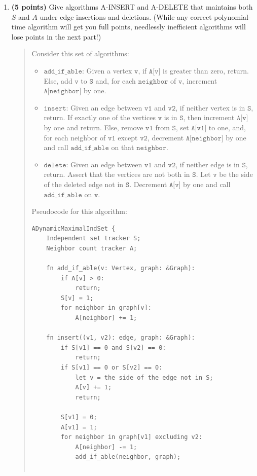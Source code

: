 \documentclass[11pt]{article}
\newcommand{\code}[1]{$\texttt{#1}$}
\begin{document}
\begin{enumerate}
\begin{enumerate}[resume]
    \item {\bf (5 points)} Give algorithms A-INSERT and A-DELETE that maintains both $S$ and $A$ under edge insertions and deletions. (While any correct polynomial-time algorithm will get you full points, needlessly inefficient algorithms will lose points in the next part!)
    \begin{quote}
      \color{purple}
      Consider this set of algorithms: 
      \begin{itemize}
        \item \code{add\_if\_able}: Given a vertex \code{v}, if \code{A[v]} is greater than zero, return. Else, add \code{v} to \code{S} and, for each \code{neighbor} of \code{v}, increment \code{A[neighbor]} by one.
        \item \code{insert}: Given an edge between \code{v1} and \code{v2}, if neither vertex is in \code{S}, return. If exactly one of the vertices \code{v} is in \code{S}, then increment \code{A[v]} by one and return. Else, remove \code{v1} from \code{S}, set \code{A[v1]} to one, and, for each neighbor of \code{v1} except \code{v2}, decrement \code{A[neighbor]} by one and call \code{add\_if\_able} on that \code{neighbor}.
        \item \code{delete}: Given an edge between \code{v1} and \code{v2}, if neither edge is in \code{S}, return. Assert that the vertices are not both in \code{S}. Let \code{v} be the side of the deleted edge not in \code{S}. Decrement \code{A[v]} by one and call \code{add\_if\_able} on \code{v}.
      \end{itemize}
      Pseudocode for this algorithm: 
      \newpage
    \begin{verbatim}
ADynamicMaximalIndSet {
    Independent set tracker S;
    Neighbor count tracker A;

    fn add_if_able(v: Vertex, graph: &Graph):
        if A[v] > 0:
            return;
        S[v] = 1;
        for neighbor in graph[v]:
            A[neighbor] += 1;

    fn insert((v1, v2): edge, graph: &Graph):
        if S[v1] == 0 and S[v2] == 0:
            return;
        if S[v1] == 0 or S[v2] == 0:
            let v = the side of the edge not in S;
            A[v] += 1;
            return;

        S[v1] = 0;
        A[v1] = 1;
        for neighbor in graph[v1] excluding v2:
            A[neighbor] -= 1;
            add_if_able(neighbor, graph);


\end{verbatim}
\end{quote}
\end{enumerate}
\end{enumerate}
\end{document}
